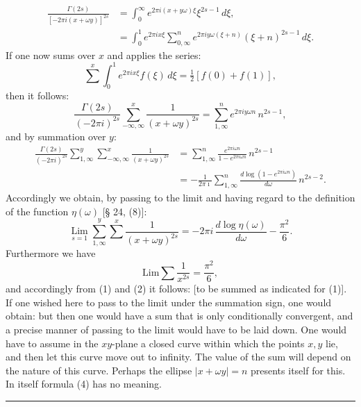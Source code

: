 
\[
\begin{aligned}
\frac{\Gamma(2s)}{[-2\pi i(x+\omega y)]^{2s}} &= \int_0^\infty e^{2\pi i(x+y\omega)\xi}\xi^{2s-1}\,d\xi,\\
&= \int_0^1 e^{2\pi i x\xi}\sum_{0,\infty}^n e^{2\pi i y\omega(\xi+n)}(\xi+n)^{2s-1}\,d\xi.
\end{aligned}
\]
If one now sums over $x$ and applies the  series:
\[
\sum^x \int_0^1 e^{2\pi i x\xi} f(\xi)\,d\xi = \tfrac{1}{2}[f(0)+f(1)],
\]
then it follows:
\[
\frac{\Gamma(2s)}{(-2\pi i)^{2s}} \sum_{-\infty,\infty}^x \frac{1}{(x+\omega y)^{2s}} = \sum_{1,\infty}^n e^{2\pi i y\omega n}\,n^{2s-1},
\]
and by summation over $y$:
\[
\begin{aligned}
\frac{\Gamma(2s)}{(-2\pi i)^{2s}} \sum_{1,\infty}^y \sum_{-\infty,\infty}^x \frac{1}{(x+\omega y)^{2s}} &= \sum_{1,\infty}^n \frac{e^{2\pi i\omega n}}{1-e^{2\pi i\omega n}}\,n^{2s-1}\\
&= -\frac{1}{2\pi \imath}\sum_{1,\infty}^n \frac{d\log(1-e^{2\pi i\omega n})}{d\omega}\,n^{2s-2}.
\end{aligned}
\]
Accordingly we obtain, by passing to the limit and having regard to the definition of the function $\eta(\omega)$ [§ 24, (8)]:
\[
\mathop{\mathrm{Lim}}\limits_{s=1}\sum_{1,\infty}^y \sum^x \frac{1}{(x+\omega y)^{2s}} = -2\pi i\,\frac{d\log\eta(\omega)}{d\omega} - \frac{\pi^2}{6}.
\]
Furthermore we have
\[
\mathrm{Lim}\sum \frac{1}{x^{2s}} = \frac{\pi^2}{6},
\]
and accordingly from (1) and (2) it follows:
[to be summed as indicated for (1)]. If one wished here to pass to the limit under the summation sign, one would obtain:
but then one would have a sum that is only conditionally convergent, and a precise manner of passing to the limit would have to be laid down. One would have to assume in the $xy$-plane a closed curve within which the points $x, y$ lie, and then let this curve move out to infinity. The value of the sum will depend on the nature of this curve. Perhaps the ellipse $|x+\omega y| = n$ presents itself for this. In itself formula (4) has no meaning.

\begin{center}\rule{3cm}{0.4pt}\end{center}
